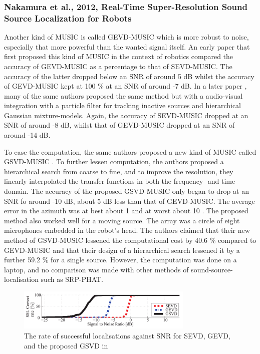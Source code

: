 \documentclass{report}
\begin{document}
\subsubsection{Nakamura et al., 2012, Real-Time Super-Resolution Sound Source Localization for Robots}

Another kind of MUSIC is called GEVD-MUSIC which is more robust to noise, especially that more powerful than the wanted signal itself. An early paper \cite{nakamura_intelligent_2009} that first proposed this kind of MUSIC in the context of robotics compared the accuracy of GEVD-MUSIC as a percentage to that of SEVD-MUSIC. The accuracy of the latter dropped below an SNR of around 5 \si{dB} whilst the accuracy of GEVD-MUSIC kept at 100 \% at an SNR of around -7 \si{dB}. In a later paper \cite{nakamura_intelligent_2011}, many of the same authors proposed the same method but with a audio-visual integration with a particle filter for tracking inactive sources and hierarchical Gaussian mixture-models. Again, the accuracy of SEVD-MUSIC dropped at an SNR of around -8 \si{dB}, whilst that of GEVD-MUSIC dropped at an SNR of around -14 \si{dB}. 

To ease the computation, the same authors proposed a new kind of MUSIC called GSVD-MUSIC \cite{nakamura_real-time_2012}. To further lessen computation, the authors proposed a hierarchical search from coarse to fine, and to improve the resolution, they linearly interpolated the transfer-functions in both the frequency- and time-domain. The accuracy of the proposed GSVD-MUSIC only began to drop at an SNR fo around -10 \si{dB}, about 5 \si{dB} less than that of GEVD-MUSIC. The average error in the azimuth was at best about 1 \si{\deg} and at worst about 10 \si{\deg}. The proposed method also worked well for a moving source. The array was a circle of eight microphones embedded in the robot's head. The authors claimed that their new method of GSVD-MUSIC lessened the computational cost by 40.6 \% compared to GEVD-MUSIC and that their design of a hierarchical search lessened it by a further 59.2 \% for a single source. However, the computation was done on a laptop, and no comparison was made with other methods of sound-source-localisation such as SRP-PHAT.

\begin{figure}[H]
\includegraphics[width=0.75\textwidth]{./nakamura_2012/rate_SNR.png}
\centering
\caption{The rate of successful localisations against SNR for SEVD, GEVD, and the proposed GSVD in \cite{nakamura_real-time_2012}}
\label{fig:nakamura_2012_rate_SNR}
\centering
\end{figure}
\end{document}
